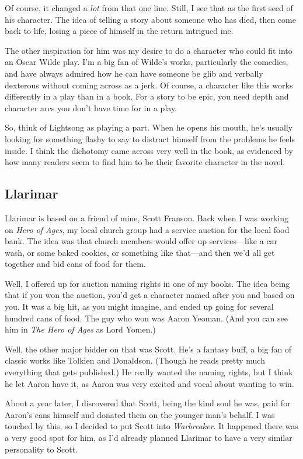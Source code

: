 Of course, it changed a \textit{lot} from that one line. Still, I see that as the first seed of his character. The idea of telling a story about someone who has died, then come back to life, losing a piece of himself in the return intrigued me.

The other inspiration for him was my desire to do a character who could fit into an Oscar Wilde play. I’m a big fan of Wilde’s works, particularly the comedies, and have always admired how he can have someone be glib and verbally dexterous without coming across as a jerk. Of course, a character like this works differently in a play than in a book. For a story to be epic, you need depth and character arcs you don’t have time for in a play.

So, think of Lightsong as playing a part. When he opens his mouth, he’s usually looking for something flashy to say to distract himself from the problems he feels inside. I think the dichotomy came across very well in the book, as evidenced by how many readers seem to find him to be their favorite character in the novel.

\subsection*{Llarimar}

Llarimar is based on a friend of mine, Scott Franson. Back when I was working on \textit{Hero of Ages}, my local church group had a service auction for the local food bank. The idea was that church members would offer up services—like a car wash, or some baked cookies, or something like that—and then we’d all get together and bid cans of food for them.

Well, I offered up for auction naming rights in one of my books. The idea being that if you won the auction, you’d get a character named after you and based on you. It was a big hit, as you might imagine, and ended up going for several hundred cans of food. The guy who won was Aaron Yeoman. (And you can see him in \textit{The Hero of Ages} as Lord Yomen.)

Well, the other major bidder on that was Scott. He’s a fantasy buff, a big fan of classic works like Tolkien and Donaldson. (Though he reads pretty much everything that gets published.) He really wanted the naming rights, but I think he let Aaron have it, as Aaron was very excited and vocal about wanting to win.

About a year later, I discovered that Scott, being the kind soul he was, paid for Aaron’s cans himself and donated them on the younger man’s behalf. I was touched by this, so I decided to put Scott into \textit{Warbreaker}. It happened there was a very good spot for him, as I’d already planned Llarimar to have a very similar personality to Scott.


